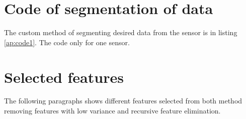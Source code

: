 \documentclass[USenglish]{ifimaster}  %
\begin{document}
\chapter{Code of segmentation of data} \label{ap:code}
The custom method of segmenting desired data from the sensor is in listing \ref{ap:code1}. The code only for one sensor.

\chapter{Selected features} \label{ap:self}
The following paragraphs shows different features selected from both method removing features with low variance and recursive feature elimination.
\end{document}
